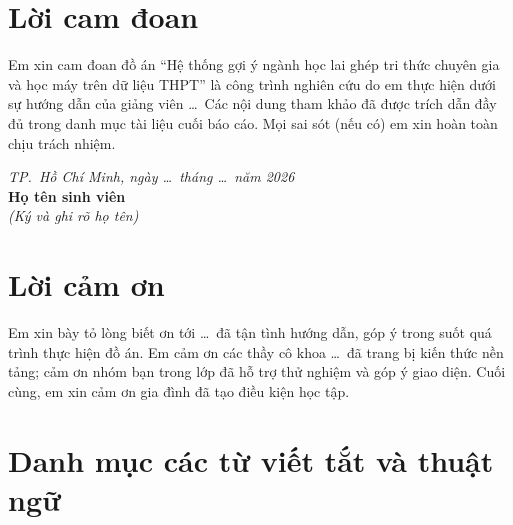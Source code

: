 \chapter*{Lời cam đoan}

Em xin cam đoan đồ án ``Hệ thống gợi ý ngành học lai ghép tri thức chuyên gia và học máy trên dữ liệu THPT'' là công trình nghiên cứu do em thực hiện dưới sự hướng dẫn của giảng viên \ldots\ Các nội dung tham khảo đã được trích dẫn đầy đủ trong danh mục tài liệu cuối báo cáo. Mọi sai sót (nếu có) em xin hoàn toàn chịu trách nhiệm.

\vspace{2em}
\begin{flushright}
\textit{TP.\ Hồ Chí Minh, ngày \ldots\ tháng \ldots\ năm 2026}\\[1em]
\textbf{Họ tên sinh viên}\\[0.5em]
\textit{(Ký và ghi rõ họ tên)}
\end{flushright}

\chapter*{Lời cảm ơn}

Em xin bày tỏ lòng biết ơn tới \ldots\ đã tận tình hướng dẫn, góp ý trong suốt quá trình thực hiện đồ án. Em cảm ơn các thầy cô khoa \ldots\ đã trang bị kiến thức nền tảng; cảm ơn nhóm bạn trong lớp đã hỗ trợ thử nghiệm và góp ý giao diện. Cuối cùng, em xin cảm ơn gia đình đã tạo điều kiện học tập.

\chapter*{Danh mục các từ viết tắt và thuật ngữ}

